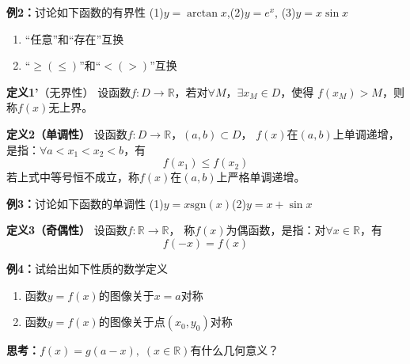 \begin{frame}
	\linespread{1.4}
	\begin{exampleblock}{{\bf 例2：}讨论如下函数的有界性}
		\quad(1)\;$y=\arctan x$,\hspace{2em}\pause (2)\;$y=e^x$,\hspace{2em}\pause
		(3)\;$y=x\sin x$\pause
	\end{exampleblock}
	\pause 
	\begin{enumerate}
	  \item \alert{“任意”和“存在”互换}\pause 
	  \item \alert{“$\geq(\leq)$”和“$<(>)$”互换}\pause 
	\end{enumerate}
	\begin{block}{{\bf 定义1'}（无界性）}
		设函数$f:D\to\mathbb{R}$，若对$\forall M$，$\exists x_M\in D$，使得
		$f(x_M)>M$，则称{\bb $f(x)$无上界}。
	\end{block}
\end{frame}

\begin{frame}
	\linespread{1.4}
	\begin{block}{{\bf 定义2（单调性）}}\pause 
		设函数$f:D\to\mathbb{R}$，$(a,b)\subset D$，\pause 
		{\bb $f(x)$在$(a,b)$上单调递增}，是指：\pause $\forall a<x_1<x_2<b$，有
		$$f(x_1)\leq f(x_2)$$
		\pause 若上式中等号恒不成立，称{\bb $f(x)$在$(a,b)$上严格单调递增}。
	\end{block}\pause 
	\begin{exampleblock}{{\bf 例3：}讨论如下函数的单调性}
		\quad(1)\;$y=x\mathrm{sgn}(x)$\pause\hspace{3cm}(2)\;$y=x+\sin x$
	\end{exampleblock}
\end{frame}

\begin{frame}
	\linespread{1.4}
	\begin{block}{{\bf 定义3（奇偶性）}}\pause 
		设函数$f:\mathbb{R}\to\mathbb{R}$，\pause 
		{\bb 称$f(x)$为偶函数}，是指：\pause 对$\forall x\in\mathbb{R}$，有
		$$f(-x)=f(x)$$
	\end{block}\pause 
	\bigskip
	\begin{exampleblock}{{\bf 例4：}试给出如下性质的数学定义}\pause
		\begin{enumerate}
		  \item 函数$y=f(x)$的图像关于$x=a$对称\pause
		  \item 函数$y=f(x)$的图像关于点$(x_0,y_0)$对称\pause
		\end{enumerate}
	\end{exampleblock}
	\alert{{\bf 思考：}$f(x)=g(a-x),\;(x\in\mathbb{R})$有什么几何意义？}
\end{frame}


